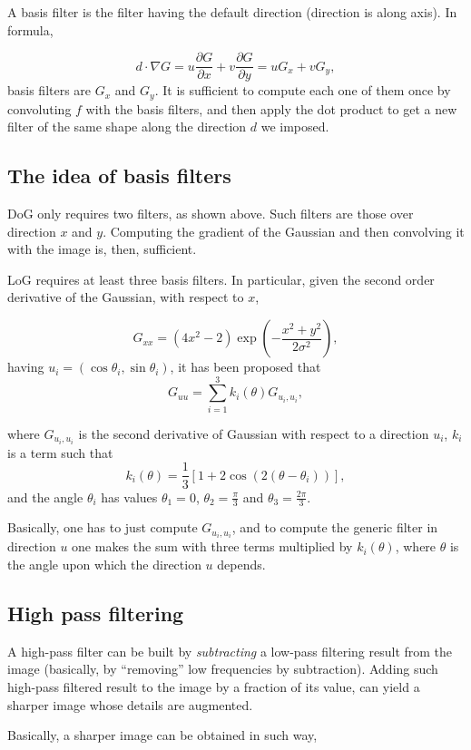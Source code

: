 \documentclass[10pt]{report}
\begin{document}
A basis filter is the filter having the default direction (direction is
along axis). In formula,

\[d \cdot \nabla G = u\frac{\partial G}{\partial x} + v\frac{\partial G}{\partial y} = u G_x + v G_y,\]
basis filters are \(G_x\) and \(G_y\). It is sufficient to compute each
one of them once by convoluting \(f\) with the basis filters, and then
apply the dot product to get a new filter of the same shape along the
direction \(d\) we imposed.

\subsection{The idea of basis filters}
\label{the-idea-of-basis-filters}
DoG only requires two filters, as shown above. Such filters are those
over direction \(x\) and \(y\). Computing the gradient of the Gaussian
and then convolving it with the image is, then, sufficient.

LoG requires at least three basis filters. In particular, given the
second order derivative of the Gaussian, with respect to \(x\),

\[G_{xx} = (4x^2 - 2)\exp{\left(-\frac{x^2 + y^2}{2\sigma^2}\right)},\]
having \(u_i = (\cos\theta_i, \sin\theta_i)\), it has been proposed that
\[G_{uu} = \sum_{i=1}^3 k_i(\theta)G_{u_i, u_i},\]

where \(G_{u_i, u_i}\) is the second derivative of Gaussian with respect
to a direction \(u_i\), \(k_i\) is a term such that
\[k_i(\theta) = \frac{1}{3}[1 + 2\cos(2(\theta - \theta_i))],\] and the
angle \(\theta_i\) has values \(\theta_1 = 0\),
\(\theta_2 = \frac{\pi}{3}\) and \(\theta_3 = \frac{2\pi}{3}\).

Basically, one has to just compute \(G_{u_i, u_i}\), and to compute the
generic filter in direction \(u\) one makes the sum with three terms
multiplied by \(k_i(\theta)\), where \(\theta\) is the angle upon which
the direction \(u\) depends.

\subsection{High pass filtering}
\label{sec:org8e6ba18}
A high-pass filter can be built by \emph{subtracting} a low-pass filtering
result from the image (basically, by ``removing'' low frequencies by
subtraction). Adding such high-pass filtered result to the image by a
fraction of its value, can yield a sharper image whose details are
augmented.

Basically, a sharper image can be obtained in such way,
\end{document}
